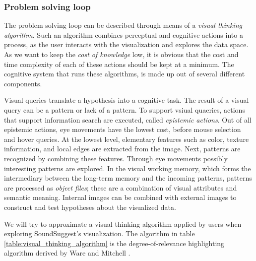 


\subsubsection{Problem solving loop}\label{subsubsection:problem_solving_loop}

The problem solving loop can be described through means of a \emph{visual thinking algorithm}\cite{ware:2004}. Such an algorithm combines perceptual and cognitive actions into a process, as the user interacts with the visualization and explores the data space. As we want to keep the \emph{cost of knowledge} low, it is obvious that the cost and time complexity of each of these actions should be kept at a minimum. The cognitive system that runs these algorithms, is made up out of several different components\cite{ware:2004}.

Visual queries translate a hypothesis into a cognitive task. The result of a visual query can be a pattern or lack of a pattern. To support vsiual quaeries, actions that support information search are executed, called \emph{epistemic actions}. Out of all epistemic actions, eye movements have the lowest cost, before mouse selection and hover queries. At the lowest level, elementary features such as color, texture information, and local edges are extracted from the image. Next, patterns are recognized by combining these features. Through eye movements possibly interesting patterns are explored. In the visual working memory, which forms the intermediary between the long-term memory and the incoming patterns, patterns are processed as \emph{object files}; these are a combination of visual attributes and semantic meaning. Internal images can be combined with external images to construct and test hypotheses about the visualized data.

We will try to approximate a visual thinking algorithm applied by users when exploring SoundSuggest's visualization. The algorithm in table \ref{table:visual_thinking_algorithm} is the degree-of-relevance highlighting algorithm derived by Ware and Mitchell \cite{ware:2004}.

